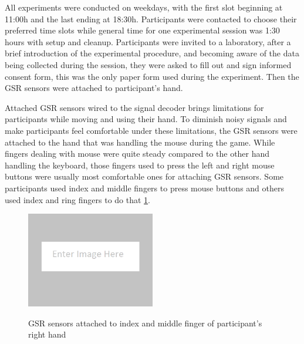 All experiments were conducted on weekdays, with the first slot beginning at 11:00h and the last ending at 18:30h. Participants were contacted to choose their preferred time slots while general time for one experimental session was 1:30 hours with setup and cleanup. Participants were invited to a laboratory, after a brief introduction of the experimental procedure, and becoming aware of the data being collected during the session, they were asked to fill out and sign informed consent form, this was the only paper form used during the experiment. Then the GSR sensors were attached to participant's hand.

Attached GSR sensors wired to the signal decoder brings limitations for participants while moving and using their hand. To diminish noisy signals and make participants feel comfortable under these limitations, the GSR sensors were attached to the hand that was handling the mouse during the game. While fingers dealing with mouse were quite steady compared to the other hand handling the keyboard, those fingers used to press the left and right mouse buttons were usually most comfortable ones for attaching GSR sensors. Some participants used index and middle fingers to press mouse buttons and others used index and ring fingers to do that \ref{fig:gsr-attached}.

\begin{figure}[h!]
  \caption[Attaching GSR sensors]
  {GSR sensors attached to index and middle finger of participant's right hand}
  \centering
  \includegraphics[width=0.5\textwidth]{images/placeholder.png}
  \label{fig:gsr-attached}
\end{figure}

